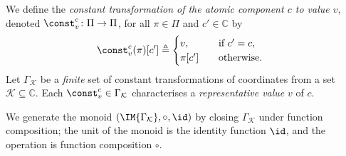 {%
\begin{definition}
  \label{def:IdempotentMonoid}
We define the \emph{constant transformation of the atomic component $c$ to value $v$}, denoted $\const^{c}_{v}\colon \Pi\rightarrow \Pi$, for all $\pi \in \Pi$ and $c'\in \mathbb{C}$ by
  \begin{align}
    \const^{c}_{v}(\pi)[c']& \triangleq 
    \begin{cases}
     v, &\quad \text{if $c'=c$,}\\
     \pi[c']&\quad \text{otherwise.}
    \end{cases}
  \end{align} 
Let $\Gamma_\mathcal{K}$ be a \emph{finite} set of constant transformations of coordinates from a set $\mathcal{K}\subseteq\mathbb{C}$. Each $\const^{c}_{v}\in \Gamma_\mathcal{K}$ characterises a \emph{representative value} $v$ of $c$.

We generate the monoid $(\IM{\Gamma_{\mathcal{K}}},\circ,\id)$ %
by closing %
$\Gamma_{\mathcal{K}}$ under function composition; the unit of the monoid is the identity function $\id$, and the operation is function composition $\circ$. 


\end{definition}}
